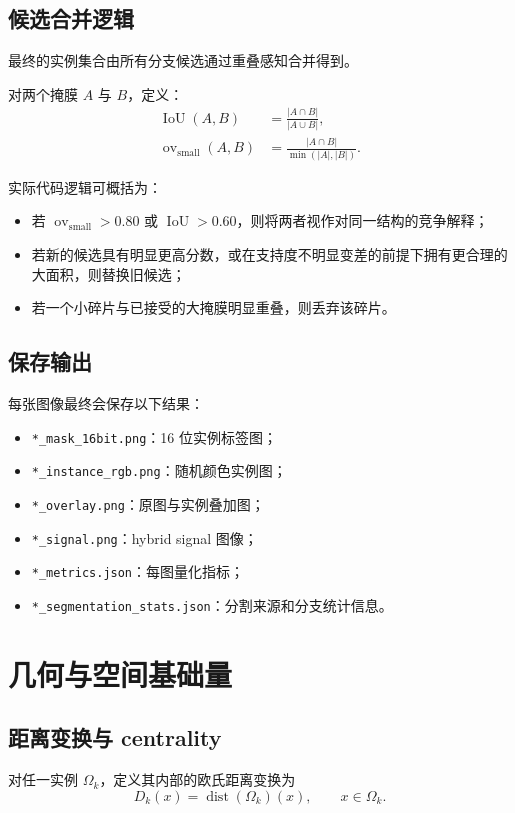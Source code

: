 \documentclass[11pt]{article}
\newcommand{\1}{\mathbf{1}}
\newcommand{\IoU}{\operatorname{IoU}}
\newcommand{\ovsmall}{\operatorname{ov}_{\mathrm{small}}}
\newcommand{\dist}{\operatorname{dist}}
\begin{document}
\subsection{候选合并逻辑}
最终的实例集合由所有分支候选通过重叠感知合并得到。

对两个掩膜 $A$ 与 $B$，定义：
\begin{align}
\IoU(A,B) &= \frac{|A\cap B|}{|A\cup B|},\\
\ovsmall(A,B) &= \frac{|A\cap B|}{\min(|A|,|B|)}.
\end{align}

实际代码逻辑可概括为：
\begin{itemize}[leftmargin=1.5em]
  \item 若 $\ovsmall>0.80$ 或 $\IoU>0.60$，则将两者视作对同一结构的竞争解释；
  \item 若新的候选具有明显更高分数，或在支持度不明显变差的前提下拥有更合理的大面积，则替换旧候选；
  \item 若一个小碎片与已接受的大掩膜明显重叠，则丢弃该碎片。
\end{itemize}

\subsection{保存输出}
每张图像最终会保存以下结果：
\begin{itemize}[leftmargin=1.5em]
  \item \texttt{*\_mask\_16bit.png}：16 位实例标签图；
  \item \texttt{*\_instance\_rgb.png}：随机颜色实例图；
  \item \texttt{*\_overlay.png}：原图与实例叠加图；
  \item \texttt{*\_signal.png}：hybrid signal 图像；
  \item \texttt{*\_metrics.json}：每图量化指标；
  \item \texttt{*\_segmentation\_stats.json}：分割来源和分支统计信息。
\end{itemize}

\section{几何与空间基础量}
\subsection{距离变换与 centrality}
对任一实例 $\Omega_k$，定义其内部的欧氏距离变换为
\begin{equation}
D_k(x) = \dist(\Omega_k)(x), \qquad x\in\Omega_k.
\end{equation}
\end{document}
